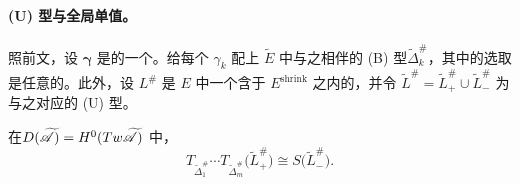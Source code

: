 \paragraph{(U) 型\trBrane{}与全局单值。}\label{sub:type-u-branes-global-monodromy}
照前文，设 $\boldsymbol{\gamma}$ 是\trVanishingPath{}的一个\trDistinguishedBasis。给每个 $\gamma_k$ 配上 $\widetilde{E}$ 中与之相伴的 (B) 型\trEquivariant\trBrane{}$\widetilde{\Delta}^{\#}_k$，其中\trGrading{}的选取是任意的。此外，设 $L^{\#}$ 是 $E$ 中一个含于 $E^{\mathrm{shrink}}$ 之内的\trExactLagrangianBrane，并令 $\widetilde{L}^{\#}=\widetilde{L}^{\#}_{+}\cup\widetilde{L}^{\#}_{-}$ 为与之对应的 (U) 型\trEquivariant\trBrane。
\begin{lemma}\label{thm:type-u-shift-relation}
在\trDerivedCategory{}$D(\widetilde{\mathscr{A}})=H^{0}(Tw\widetilde{\mathscr{A}})$ 中，
\begin{equation}\label{eq:type-u-twist-shift}
T_{\widetilde{\Delta}^{\#}_1}\cdots T_{\widetilde{\Delta}^{\#}_m}
\bigl(\widetilde{L}^{\#}_{+}\bigr)\cong S\bigl(\widetilde{L}^{\#}_{-}\bigr).
\end{equation}
\end{lemma}
